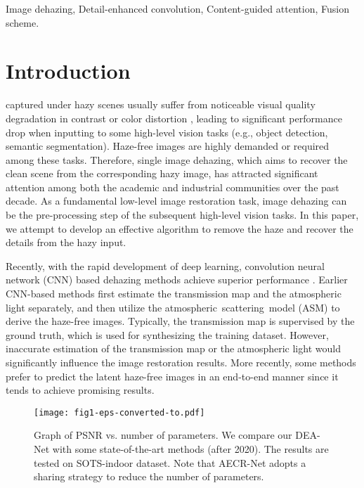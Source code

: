 \documentclass[lettersize,journal]{IEEEtran}
\begin{document}
\begin{IEEEkeywords}
Image dehazing, Detail-enhanced convolution, Content-guided attention, Fusion scheme.
\end{IEEEkeywords}

\section{Introduction}
\label{sec: introduction}
captured under hazy scenes usually suffer from noticeable visual quality degradation in contrast or color distortion \cite{Tan2008CVPR}, leading to significant performance drop when inputting to some high-level vision tasks (e.g., object detection, semantic segmentation).
Haze-free images are highly demanded or required among these tasks.
Therefore, single image dehazing, which aims to recover the clean scene from the corresponding hazy image, has attracted significant attention among both the academic and industrial communities over the past decade.
As a fundamental low-level image restoration task, image dehazing can be the pre-processing step of the subsequent high-level vision tasks.
In this paper, we attempt to develop an effective algorithm to remove the haze and recover the details from the hazy input.

Recently, with the rapid development of deep learning, convolution neural network (CNN) based dehazing methods achieve superior performance \cite{cai2016TIP,li2017ICCV,li2020TIP,qin2020AAAI,wu2021CVPR}.
Earlier CNN-based methods \cite{cai2016TIP,ren2016ECCV,zhang2018CVPR} first estimate the transmission map and the atmospheric light separately, and then utilize the atmospheric scattering model (ASM) \cite{Narasimhan2003TPAMI-ASM} to derive the haze-free images.
Typically, the transmission map is supervised by the ground truth, which is used for synthesizing the training dataset.
However, inaccurate estimation of the transmission map or the atmospheric light would significantly influence the image restoration results.
More recently, some methods \cite{dong2020CVPR,wu2021CVPR,ye2022ECCVORAL} prefer to predict the latent haze-free images in an end-to-end manner since it tends to achieve promising results.


\begin{figure}[!t]
	\centering
	\texttt{[image: fig1-eps-converted-to.pdf]}
	\caption{Graph of PSNR vs. number of parameters. We compare our DEA-Net with some state-of-the-art methods (after 2020). The results are tested on SOTS-indoor dataset. Note that AECR-Net adopts a sharing strategy to reduce the number of parameters.}
	\label{fig:fig1}
\end{figure}
\end{document}
